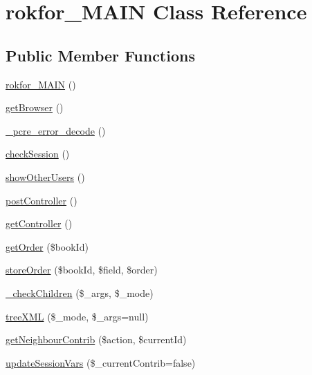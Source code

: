\hypertarget{classrokfor___m_a_i_n}{
\section{rokfor\-\_\-\-M\-A\-I\-N \-Class \-Reference}
\label{classrokfor___m_a_i_n}
}
\subsection*{\-Public \-Member \-Functions}
\begin{DoxyCompactItemize}
\item 
\hyperlink{classrokfor___m_a_i_n_a58790d75d15fde1bbfc6d0075f726057}{rokfor\-\_\-\-M\-A\-I\-N} ()
\item 
\hyperlink{classrokfor___m_a_i_n_a825374e1811064e3c526524a45b8555a}{get\-Browser} ()
\item 
\hyperlink{classrokfor___m_a_i_n_a67140f8e457804aa7ffee7f9328190b2}{\-\_\-pcre\-\_\-error\-\_\-decode} ()
\item 
\hyperlink{classrokfor___m_a_i_n_ab4c240e1126dfa2e280f7d3350cbaea9}{check\-Session} ()
\item 
\hyperlink{classrokfor___m_a_i_n_aa21c9920868c093e5b51d36c936cebe9}{show\-Other\-Users} ()
\item 
\hyperlink{classrokfor___m_a_i_n_a30bafeaeb0084b2b6acff2ca13f1a6ae}{post\-Controller} ()
\item 
\hyperlink{classrokfor___m_a_i_n_aa8b89e0bad51878addc1300cd3e95b5c}{get\-Controller} ()
\item 
\hyperlink{classrokfor___m_a_i_n_a0d8cc56bb500095cd2a13004e0906c14}{get\-Order} (\$book\-Id)
\item 
\hyperlink{classrokfor___m_a_i_n_a7e731776049dc3da9ceae5182a0e3a6b}{store\-Order} (\$book\-Id, \$field, \$order)
\item 
\hyperlink{classrokfor___m_a_i_n_aad3798d7837b86510fcde80e9b8dfceb}{\-\_\-check\-Children} (\$\-\_\-args, \$\-\_\-mode)
\item 
\hyperlink{classrokfor___m_a_i_n_a73109f5ad4677dbd4d313bafe9d0a6fd}{tree\-X\-M\-L} (\$\-\_\-mode, \$\-\_\-args=null)
\item 
\hyperlink{classrokfor___m_a_i_n_adfcfc06cdb9418a811fcbaa5d0cc9272}{get\-Neighbour\-Contrib} (\$action, \$current\-Id)
\item 
\hyperlink{classrokfor___m_a_i_n_a108ad27281382d1bc1762ae8f1496fe1}{update\-Session\-Vars} (\$\-\_\-current\-Contrib=false)
\item 

\end{DoxyCompactItemize}
